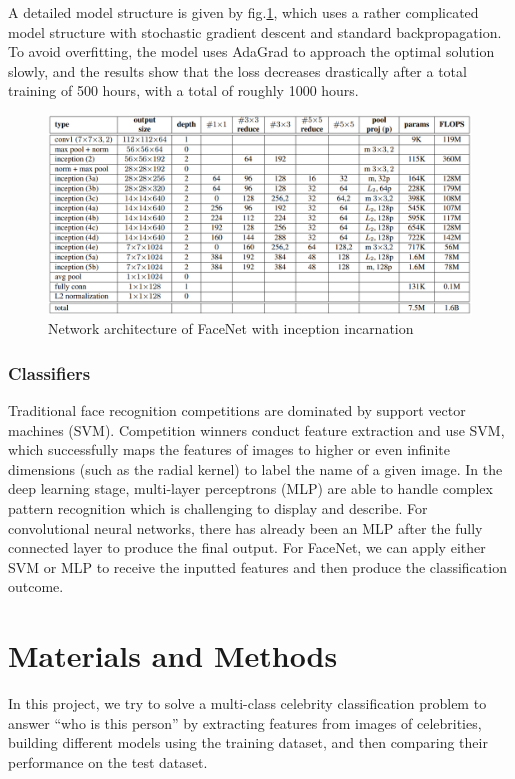 A detailed model structure is given by fig.\ref{pic:facenetX}, which uses a rather complicated model structure with stochastic gradient descent and standard backpropagation. To avoid overfitting, the model uses AdaGrad to approach the optimal solution slowly, and the results show that the loss decreases drastically after a total training of 500 hours, with a total of roughly 1000 hours. 
\begin{figure}[H]
    \centering\includegraphics[width=14cm]{./figures/facenetX.png}
    \caption{Network architecture of FaceNet with inception incarnation}
    \label{pic:facenetX}
\end{figure}


\subsubsection{Classifiers}
Traditional face recognition competitions are dominated by support vector machines (SVM). Competition winners conduct feature extraction and use SVM, which successfully maps the features of images to higher or even infinite dimensions (such as the radial kernel) to label the name of a given image. In the deep learning stage, multi-layer perceptrons (MLP) are able to handle complex pattern recognition which is challenging to display and describe. For convolutional neural networks, there has already been an MLP after the fully connected layer to produce the final output. For FaceNet, we can apply either SVM or MLP to receive the inputted features and then produce the classification outcome.

\section{Materials and Methods}
In this project, we try to solve a multi-class celebrity classification problem to answer ``who is this person'' by extracting features from images of celebrities, building different models using the training dataset, and then comparing their performance on the test dataset.


